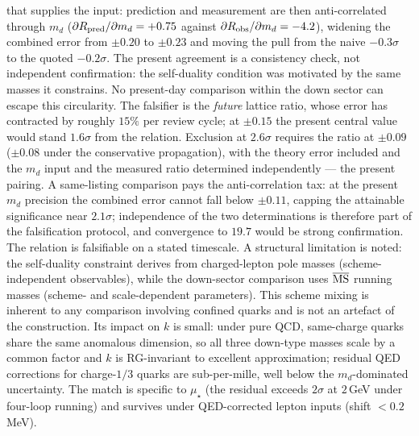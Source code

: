 \documentclass[11pt]{article}
\begin{document}
that supplies the input: prediction and measurement are then
anti-correlated through $m_d$ ($\partial R_{\rm pred}/\partial m_d = +0.75$
against $\partial R_{\rm obs}/\partial m_d = -4.2$), widening the combined
error from $\pm0.20$ to $\pm0.23$ and moving the pull from the naive
$-0.3\sigma$ to the quoted $-0.2\sigma$.
The present agreement is a consistency check, not independent
confirmation: the self-duality condition was motivated by the same masses
it constrains. No present-day comparison within the down sector can escape
this circularity. The falsifier is the \emph{future} lattice ratio, whose
error has contracted by roughly $15\%$ per review cycle; at $\pm0.15$ the
present central value would stand $1.6\sigma$ from the relation. Exclusion
at $2.6\sigma$ requires the ratio at $\pm0.09$ ($\pm0.08$ under the
conservative propagation), with the theory error included and the $m_d$
input and the measured ratio determined independently --- the present
pairing. A same-listing comparison pays the anti-correlation tax: at the
present $m_d$ precision the combined error cannot fall below $\pm0.11$,
capping the attainable significance near $2.1\sigma$; independence of the
two determinations is therefore part of the falsification protocol, and
convergence to $19.7$ would be strong confirmation. The relation is falsifiable
on a stated timescale. A structural limitation is noted: the self-duality
constraint derives from charged-lepton pole masses (scheme-independent
observables), while the down-sector comparison uses $\overline{\rm MS}$
running masses (scheme- and scale-dependent parameters). This scheme mixing is
inherent to any comparison involving confined quarks and is not an artefact of
the construction. Its impact on $k$ is small: under pure QCD, same-charge
quarks share the same anomalous dimension, so all three down-type masses scale
by a common factor and $k$ is RG-invariant to excellent approximation; residual QED corrections
for charge-$1/3$ quarks are sub-per-mille, well below the $m_d$-dominated
uncertainty. The match is specific to $\mu_\star$ (the residual exceeds
$2\sigma$ at $2$\,GeV under four-loop running) and survives under
QED-corrected lepton inputs (shift $<0.2$\,MeV).
\end{document}
